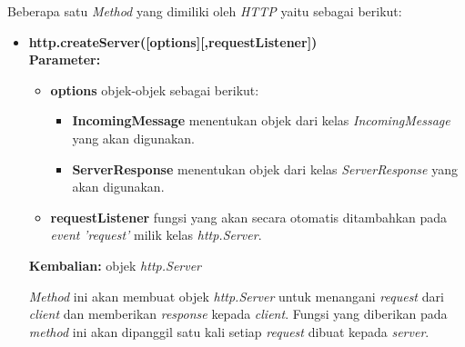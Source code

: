 Beberapa satu \textit{Method} yang dimiliki oleh \textit{HTTP} yaitu sebagai berikut:
\begin{itemize}
	\item \textbf{http.createServer([options][,requestListener])} \\ \textbf{Parameter:}
	\begin{itemize}
		\item \textbf{options} objek-objek sebagai berikut:
			\begin{itemize}
				\item \textbf{IncomingMessage} menentukan objek dari kelas \textit{IncomingMessage} yang akan digunakan.
				\item \textbf{ServerResponse} menentukan objek dari kelas \textit{ServerResponse} yang akan digunakan.
			\end{itemize}
			
		\item \textbf{requestListener} fungsi yang akan secara otomatis ditambahkan pada \textit{event} \textit{'request'} milik kelas \textit{http.Server}.
	\end{itemize}
	\textbf{Kembalian:} objek \textit{http.Server}
	
	\textit{Method} ini akan membuat objek \textit{http.Server} untuk menangani \textit{request} dari \textit{client} dan memberikan \textit{response} kepada \textit{client}. Fungsi yang diberikan pada \textit{method} ini akan dipanggil satu kali setiap \textit{request} dibuat kepada \textit{server}.
	

\end{itemize}
